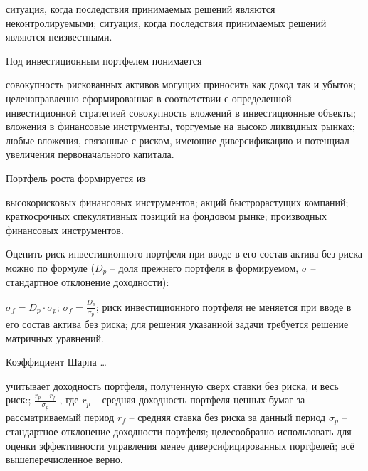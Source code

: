 \documentclass[12pt, table, twoside, a4paper]{exam}
\begin{document}
\begin{questions}
\begin{multicols}{2}
\begin{choices}
	 \choice ситуация, когда последствия принимаемых решений являются неконтролируемыми;
	 \choice ситуация, когда последствия принимаемых решений являются неизвестными.
	 \end{choices}
\question Под инвестиционным портфелем понимается
	 \begin{choices}
	 \choice совокупность рискованных активов могущих приносить как доход так и убыток;
	 \CC целенаправленно сформированная в соответствии с определенной инвестиционной стратегией совокупность вложений в инвестиционные объекты;
	 \choice вложения в финансовые инструменты, торгуемые на высоко ликвидных рынках;
	 \choice любые вложения, связанные с риском, имеющие диверсификацию и потенциал увеличения первоначального капитала.
	 \end{choices}
\question Портфель роста формируется из
	 \begin{choices}
	 \choice высокорисковых финансовых инструментов;
	 \CC акций быстрорастущих компаний;
	 \choice краткосрочных спекулятивных позиций на фондовом рынке;
	 \choice производных финансовых инструментов.
	 \end{choices}
\question Оценить риск инвестиционного портфеля при вводе в его состав актива без риска можно по формуле ($D_p$ – доля прежнего портфеля в формируемом, $\sigma$ – стандартное отклонение доходности):
	 \begin{choices}
	 \CC $\sigma_f=D_p \cdot \sigma_p$;
	 \choice $\sigma_f=\frac{D_p}{\sigma_p}$;
	 \choice риск инвестиционного портфеля не меняется при вводе в его состав актива без риска;
	 \choice для решения указанной задачи требуется решение матричных уравнений.
	 \end{choices}
\question Коэффициент Шарпа …
	 \begin{choices}
	 \choice учитывает доходность портфеля, полученную сверх ставки без риска, и весь риск:;
	 \choice $\frac{r_p - r_f}{\sigma_p}$ , где $r_p$ – средняя доходность портфеля ценных бумаг за рассматриваемый период $r_f$ – средняя ставка без риска за данный период $\sigma_p$ – стандартное отклонение доходности портфеля;
	 \choice целесообразно использовать для оценки эффективности управления менее диверсифицированных портфелей;
	 \CC всё вышеперечисленное верно.
	 \end{choices}

\end{multicols}
\end{questions}

\end{document}
